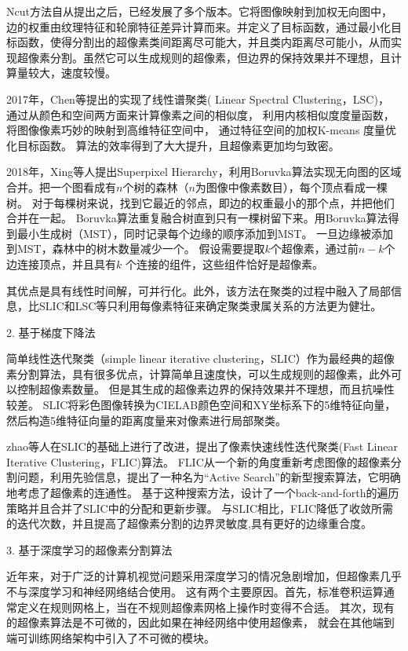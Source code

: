 Ncut\cite{shi2000normalized}方法自从提出之后，已经发展了多个版本。它将图像映射到加权无向图中，边的权重由纹理特征和轮廓特征差异计算而来。并定义了目标函数，通过最小化目标函数，使得分割出的超像素类间距离尽可能大，并且类内距离尽可能小，从而实现超像素分割。虽然它可以生成规则的超像素，但边界的保持效果并不理想，且计算量较大，速度较慢。

2017年，Chen等提出的实现了线性谱聚类( Linear Spectral Clustering，LSC)\cite{li2015superpixel}，
通过从颜色和空间两方面来计算像素之间的相似度，
利用内核相似度度量函数，将图像像素巧妙的映射到高维特征空间中，
通过特征空间的加权K-means\cite{1967Some} 度量优化目标函数。
算法的效率得到了大大提升，且超像素更加均匀致密。

2018年，Xing等人提出Superpixel Hierarchy\cite{SpHierarchy}，利用Boruvka\cite{2003Boruvka}算法实现无向图的区域合并。把一个图看成有$n$个树的森林（$n$为图像中像素数目），每个顶点看成一棵树。
对于每棵树来说，找到它最近的邻点，即边的权重最小的那个点，并把他们合并在一起。
Boruvka算法重复融合树直到只有一棵树留下来。用Boruvka算法得到最小生成树（MST），同时记录每个边缘的顺序添加到MST。
一旦边缘被添加到MST，森林中的树木数量减少一个。
假设需要提取$k$个超像素，通过前$n-k$个边连接顶点，并且具有$k$ 个连接的组件，这些组件恰好是超像素。

其优点是具有线性时间解，可并行化。此外，该方法在聚类的过程中融入了局部信息，比SLIC和LSC等只利用每像素特征来确定聚类隶属关系的方法更为健壮。

2. 基于梯度下降法

简单线性迭代聚类（simple linear iterative clustering，SLIC）作为最经典的超像素分割算法，具有很多优点，计算简单且速度快，可以生成规则的超像素，此外可以控制超像素数量。
但是其生成的超像素边界的保持效果并不理想，而且抗噪性较差。
SLIC将彩色图像转换为CIELAB颜色空间和XY坐标系下的5维特征向量，然后构造5维特征向量的距离度量来对像素进行局部聚类。

zhao等人在SLIC的基础上进行了改进，提出了像素快速线性迭代聚类(Fast Linear Iterative Clustering，FLIC)\cite{Zhao2017FLIC}算法。
FLIC从一个新的角度重新考虑图像的超像素分割问题，利用先验信息，提出了一种名为“Active Search”的新型搜索算法，它明确地考虑了超像素的连通性。
基于这种搜索方法，设计了一个back-and-forth的遍历策略并且合并了SLIC中的分配和更新步骤。
与SLIC相比，FLIC降低了收敛所需的迭代次数，并且提高了超像素分割的边界灵敏度,具有更好的边缘重合度。

3. 基于深度学习的超像素分割算法

近年来，对于广泛的计算机视觉问题采用深度学习的情况急剧增加，但超像素几乎不与深度学习和神经网络结合使用。
这有两个主要原因。首先，标准卷积运算通常定义在规则网格上，当在不规则超像素网格上操作时变得不合适。
其次，现有的超像素算法是不可微的，因此如果在神经网络中使用超像素，
就会在其他端到端可训练网络架构中引入了不可微的模块。

